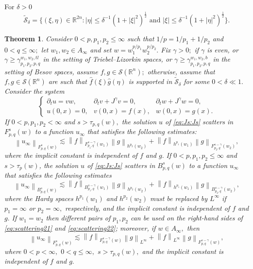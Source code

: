 \documentclass[10pt,a4paper]{article}
\newtheorem{theorem}{Theorem}[section]
\theoremstyle{remark}
\newcommand{\re}{\mathbb{R}}
\newcommand{\rn}{{{\mathbb R}^n}}
\newcommand{\sw}{{\mathcal{S}}(\rn)}
\newcommand{\itlw}[4]{F_{#1,#3}^{#2}(#4)} %
\newcommand{\ibesw}[4]{B_{#1,#3}^{#2}(#4)} %
\newcommand{\Ss}{\mathcal{S}}
\newcommand{\fhat}{\widehat{f}}
\newcommand{\ghat}{\widehat{g}}
\newcommand{\abs}[1]{\left\vert #1 \right\vert}
\newcommand{\norm}[2]{\left\|#1\right\|_{#2}}
\newcommand{\hcline}{1/p=1/p_1+1/p_2}
\newcommand{\gamt}{\gamma_{p_1,p_2,p,q}^{w_1,w_2, tl}}
\newcommand{\gamb}{\gamma_{p_1,p_2,p,q}^{w_1,w_2,b}}
\begin{document}
For $\delta >0$ 
\[ \tilde{\Ss}_{\delta}=\{(\xi,\eta)\in \re^{2n}: \abs{\eta}\le \delta^{-1}(1+\abs{\xi}^2)^\frac{1}{2} \text{ and }\abs{\xi}\le \delta^{-1}(1+\abs{\eta}^2)^\frac{1}{2}\}.\]



\begin{theorem}\label{thm:scattering2} Consider  $0 < p, p_1, p_2  \le \infty$  such that $\hcline$ and  $0 < q \leq \infty;$ let  $w_1,w_2\in A_\infty$ and set $w=w_1^{{p}/{p_1}} w_2^{{p}/{p_2}}.$ Fix $\gamma>0;$ if $\gamma$ is even, or $\gamma\ge \gamt$ in the setting of Triebel--Lizorkin spaces, or $\gamma\ge \gamb$ in the setting of Besov spaces, assume $f, g \in \sw;$ otherwise, assume that $f,g\in\sw$ are such that $\fhat(\xi)\ghat(\eta)$ is supported in $\widetilde{\Ss}_{\delta}$ for some $0<\delta\ll1.$ Consider the system 
\begin{equation}\label{eq:Js:Js}
\left\{ \begin{array}{lll}  \partial_t u =vw, & \partial_t v +J^\gamma v = 0, & \partial_t w + J^\gamma w = 0, \\
  u(0,x)=0,&v(0,x)=f(x),&w(0,x) = g(x).
 \end{array} \right.
\end{equation}
If $0 < p,p_1,p_2 < \infty$ and  $s > \tau_{p,q}(w),$ the solution $u$ of \eqref{eq:Js:Js}  scatters in $\itlw{p}{s}{q}{w}$ to a function $u_\infty$ that satisfies the following estimates: 
\begin{equation}\label{eq:scattering21}
\norm{u_\infty}{\itlw{p}{s}{q}{w}} \lesssim \norm{f}{\itlw{p_1}{s-\gamma}{q}{w_1} } \norm{g}{h^{p_2}(w_2)} +  \norm{f}{h^{p_1}(w_1)}   \norm{g}{\itlw{p_2}{s-\gamma}{q}{w_2} },
\end{equation}
where the implicit constant is independent of $f$ and $g.$  
If $0< p, p_1,p_2\leq \infty$ and $s > \tau_p(w)$, the solution $u$ of \eqref{eq:Js:Js}  scatters in $\ibesw{p}{s}{q}{w}$ to a function $u_\infty$ that satisfies the following estimates
\begin{equation}\label{eq:scattering22}
\norm{u_\infty}{\ibesw{p}{s}{q}{w}} \lesssim \norm{f}{\ibesw{p_1}{s-\gamma}{q}{w_1} } \norm{g}{h^{p_2}(w_2)} +  \norm{f}{h^{p_1}(w_1)}   \norm{g}{\ibesw{p_2}{s-\gamma}{q}{w_2} },
\end{equation}
where the Hardy spaces $h^{p_1}(w_1)$ and $h^{p_2}(w_2)$ must be replaced by $L^\infty$ if $p_1=\infty$ or $p_2=\infty,$ respectively, and the implicit constant is independent of $f$ and $g.$  
If $w_1=w_2$ then different pairs of $p_1, p_2$ can be used on the right-hand sides of \eqref{eq:scattering21} and \eqref{eq:scattering22}; moreover, if $w\in A_\infty,$ then 
\begin{equation*}
\norm{u_\infty}{\itlw{p}{s}{q}{w}} \lesssim \norm{f}{\itlw{p}{s-\gamma}{q}{w} } \norm{g}{L^\infty} +  \norm{f}{L^\infty}   \norm{g}{\itlw{p}{s-\gamma}{q}{w}},
\end{equation*}
where $0<p<\infty,$ $0<q\le\infty,$  $s>\tau_{p,q}(w),$ and the implicit constant is independent of $f$ and $g.$  
\end{theorem}  
 
\end{document}
